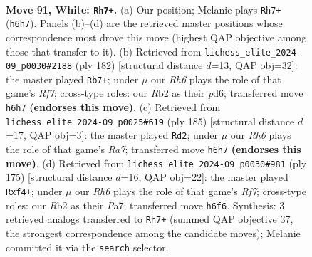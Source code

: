 \documentclass[11pt]{article}
\begin{document}
\clearpage

\begin{figure}[p]\centering
\begin{subfigure}{0.46\textwidth}\centering
\resizebox{\linewidth}{!}{%
\newchessgame
\chessboard[
  setfen={8/3k4/4pp1R/8/P1r1P3/5PK1/1R6/8 w - - 8 91},
  showmover=false,
  pgfstyle=straightmove, color=movearrow, markmove={h6-h7}
]}
\caption{}
\end{subfigure}\hfill
\begin{subfigure}{0.46\textwidth}\centering
\resizebox{\linewidth}{!}{%
\newchessgame
\chessboard[
  setfen={8/P4R2/3p4/1kp5/5p2/r4P2/2K2P2/8 w - - 7 92},
  showmover=false,
  pgfstyle=straightmove, color=movearrow, markmove={f7-b7}
]}
\caption{}
\end{subfigure}
\\[4pt]
\begin{subfigure}{0.46\textwidth}\centering
\resizebox{\linewidth}{!}{%
\newchessgame
\chessboard[
  setfen={8/7p/p6k/4R3/PP6/1K6/r3p3/8 b - - 3 93},
  showmover=false,
  pgfstyle=straightmove, color=movearrow, markmove={a2-d2}
]}
\caption{}
\end{subfigure}\hfill
\begin{subfigure}{0.46\textwidth}\centering
\resizebox{\linewidth}{!}{%
\newchessgame
\chessboard[
  setfen={8/p3PK2/7k/7p/5P2/8/5r1p/7R b - - 0 88},
  showmover=false,
  pgfstyle=straightmove, color=movearrow, markmove={f2-f4}
]}
\caption{}
\end{subfigure}
\caption{\textbf{Move 91, White: \texttt{Rh7+}.} (a) Our position; Melanie plays \texttt{Rh7+} (\texttt{h6h7}). Panels (b)--(d) are the retrieved master positions whose correspondence most drove this move (highest QAP objective among those that transfer to it). (b) Retrieved from \texttt{lichess\_elite\_2024-09\_p0030\#2188} (ply 182) [structural distance $d$=13, QAP obj=32]: the master played \texttt{Rb7+}; under $\mu$ our \emph{Rh6} plays the role of that game's \emph{Rf7}; cross-type roles: our \emph{R}b2 as their \emph{p}d6; transferred move \texttt{h6h7} \textbf{(endorses this move)}. (c) Retrieved from \texttt{lichess\_elite\_2024-09\_p0025\#619} (ply 185) [structural distance $d$=17, QAP obj=3]: the master played \texttt{Rd2}; under $\mu$ our \emph{Rh6} plays the role of that game's \emph{Ra7}; transferred move \texttt{h6h7} \textbf{(endorses this move)}. (d) Retrieved from \texttt{lichess\_elite\_2024-09\_p0030\#981} (ply 175) [structural distance $d$=16, QAP obj=22]: the master played \texttt{Rxf4+}; under $\mu$ our \emph{Rh6} plays the role of that game's \emph{Rf7}; cross-type roles: our \emph{R}b2 as their \emph{P}a7; transferred move \texttt{h6f6}. Synthesis: 3 retrieved analogs transferred to \texttt{Rh7+} (summed QAP objective 37, the strongest correspondence among the candidate moves); Melanie committed it via the \texttt{search} selector.}
\label{fig:thought-m180}
\end{figure}
\end{document}
